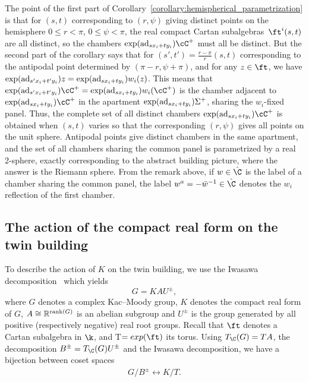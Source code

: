 The point of the first part of Corollary~\ref{corollary:hemispherical_parametrization} is that for $(s,t)$ corresponding to $(r,\psi)$ giving distinct points on the hemisphere $0\leq r < \pi$, $0\leq\psi<\pi$, the real compact Cartan subalgebras~$\ft^i(s,t)$ are all distinct, so the chambers $\exp( {\rm ad}_{sx_i+ty_i}) \cC^+$ must all be distinct. But the second part of the corollary says that for $(s',t') = \frac{r-\pi}{r}(s,t)$ corresponding to the antipodal point determined by $(\pi-r,\psi+\pi)$,
and for any $z\in\ft$, we have $\exp( {\rm ad}_{s'x_i+t'y_i}) z = \exp( {\rm ad}_{sx_i+ty_i}) w_i(z)$. This means that $\exp( {\rm ad}_{s'x_i+t'y_i}) \cC^+ = \exp( {\rm ad}_{sx_i+ty_i}) w_i(\cC^+)$ is the chamber adjacent to $\exp( {\rm ad}_{sx_i+ty_i}) \cC^+$ in the apartment $\exp( {\rm ad}_{sx_i+ty_i}) \Sigma^+$, sharing the $w_i$-fixed panel. Thus, the complete set of all distinct
chambers $\exp( {\rm ad}_{sx_i+ty_i}) \cC^+$ is obtained when $(s,t)$ varies so that the corresponding $(r,\psi)$ gives all points on the unit sphere. Antipodal points give distinct chambers in the same apartment, and the set of all chambers sharing the common panel is parametrized by a real 2-sphere, exactly corresponding to the abstract building picture, where the answer is the Riemann sphere. From the remark above, if $w\in\hat\C$ is the label of a chamber sharing the common panel, the
label $w^a = -{\bar w}^{-1} \in\hat\C$ denotes the $w_i$ reflection of the first chamber.

\subsection{The action of the compact real form on the twin building}\label{subsection:action_of_compact_real_form}
To describe the action of $K$ on the twin building, we use the Iwasawa decomposition~\cite{deMedtsGramlichHorn09} which yields
\[G=KAU^{\pm},\]
where $G$ denotes a complex Kac--Moody group, $K$ denotes the compact real form of $G$, $A\cong \mathbb{R}^{{\rm rank}(G)}$ is an abelian subgroup and $U^{\pm}$ is the group generated by all positive (respectively negative) real root groups. Recall that $\ft$ denotes
a Cartan subalgebra in $\k$, and T$=exp(\ft)$ its torus. Using $T_\C(G) = TA$, the decomposition $B^{\pm}=T_\C(G) U^{\pm}$ and the Iwasawa decomposition, we have a bijection between coset spaces
 \begin{gather}\label{equation:GB=KT}
 G/B^{\pm} \leftrightarrow K/T.
 \end{gather}

